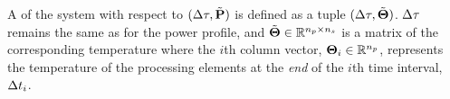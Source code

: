 A  of the system with respect to $\pP$ is defined as a tuple $\pT$. $\Delta \tau$ remains the same as for the power profile, and $\mTO \in \real^{\cores \times \steps}$ is a matrix of the corresponding temperature where the $i$th column vector, ${\boldsymbol\Theta}_i \in \mathbb{R}^{n_p}$, represents the temperature of the processing elements at the \emph{end} of the $i$th time interval, $\Delta t_i$.
